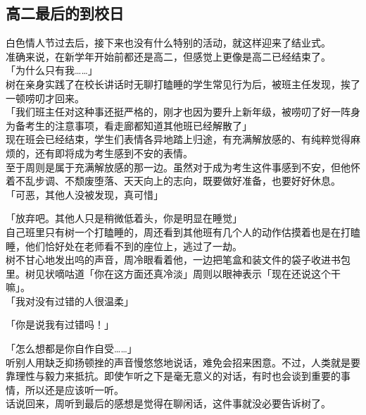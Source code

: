 \subsection{高二最后的到校日}

白色情人节过去后，接下来也没有什么特别的活动，就这样迎来了结业式。\\

准确来说，在新学年开始前都还是高二，但感觉上更像是高二已经结束了。\\

「为什么只有我……」\\

树在亲身实践了在校长讲话时无聊打瞌睡的学生常见行为后，被班主任发现，挨了一顿唠叨才回来。\\

「我们班主任对这种事还挺严格的，刚才也因为要升上新年级，被唠叨了好一阵身为备考生的注意事项，看走廊都知道其他班已经解散了」\\

现在班会已经结束，学生们表情各异地踏上归途，有充满解放感的、有纯粹觉得麻烦的，还有即将成为考生感到不安的表情。\\

至于周则是属于充满解放感的那一边。虽然对于成为考生这件事感到不安，但他怀着不乱步调、不颓废堕落、天天向上的志向，既要做好准备，也要好好休息。\\

「可恶，其他人没被发现，真可惜」

「放弃吧。其他人只是稍微低着头，你是明显在睡觉」\\

自己班里只有树一个打瞌睡的，周还看到其他班有几个人的动作估摸着也是在打瞌睡，他们恰好处在老师看不到的座位上，逃过了一劫。\\

树不甘心地发出呜的声音，周冷眼看着他，一边把笔盒和装文件的袋子收进书包里。树见状嘀咕道「你在这方面还真冷淡」周则以眼神表示「现在还说这个干嘛」。\\

「我对没有过错的人很温柔」

「你是说我有过错吗！」

「怎么想都是你自作自受……」\\

听别人用缺乏抑扬顿挫的声音慢悠悠地说话，难免会招来困意。不过，人类就是要靠理性与毅力来抵抗。即使乍听之下是毫无意义的对话，有时也会谈到重要的事情，所以还是应该听一听。\\

话说回来，周听到最后的感想是觉得在聊闲话，这件事就没必要告诉树了。\\

